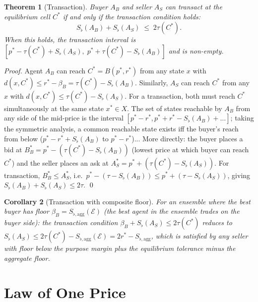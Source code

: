 \documentclass[twocolumn,11pt,a4paper]{article}
\newtheorem{theorem}{Theorem}[section]
\newtheorem{corollary}[theorem]{Corollary}
\theoremstyle{remark}
\newcommand{\Sflat}{S_{\flat}}
\newcommand{\tol}{\tau}
\newcommand{\Ens}{\mathcal{E}}
\newcommand{\MidP}{p^*}                  %
\newcommand{\Bid}{B^*}                   %
\newcommand{\Ask}{A^*}                   %
\newcommand{\SflatT}{S_{\flat,\mathrm{agg}}}        %
\begin{document}
\begin{theorem}[Transaction]
\label{thm:transaction}
Buyer $A_B$ and seller $A_S$ can transact at the equilibrium cell $C^*$
if and only if the transaction condition holds:
\[
  \Sflat(A_B) + \Sflat(A_S) \;\le\; 2\tol(C^*).
\]
When this holds, the \emph{transaction interval} is
$[\MidP - \tol(C^*) + \Sflat(A_S),\; \MidP + \tol(C^*) - \Sflat(A_B)]$
and is non-empty.
\end{theorem}
\begin{proof}
Agent $A_B$ can reach $C^* = B(\MidP, r^*)$ from any state $x$ with
$d(x, C^*) \le r^* - \beta_B = \tol(C^*) - \Sflat(A_B)$.  Similarly,
$A_S$ can reach $C^*$ from any $x$ with $d(x, C^*) \le \tol(C^*) -
\Sflat(A_S)$.  For a transaction, both must reach $C^*$ simultaneously
at the same state $x^* \in X$.  The set of states reachable by $A_B$ from
any side of the mid-price is the interval
$[\MidP - r^*, \MidP + r^* - \Sflat(A_B) + \ldots]$; taking the symmetric
analysis, a common reachable state exists iff the buyer's reach from below
($\MidP - r^* + \Sflat(A_B)$ to $\MidP - r^*$)... More directly:
the buyer places a bid at $\Bid_B = \MidP - (\tol(C^*) - \Sflat(A_B))$
(lowest price at which buyer can reach $C^*$) and the seller places an ask
at $\Ask_S = \MidP + (\tol(C^*) - \Sflat(A_S))$.  For transaction,
$\Bid_B \le \Ask_S$, i.e.\
$\MidP - (\tol - \Sflat(A_B)) \le \MidP + (\tol - \Sflat(A_S))$,
giving $\Sflat(A_B) + \Sflat(A_S) \le 2\tol$. \qed
\end{proof}

\begin{corollary}[Transaction with composite floor]
\label{cor:transaction-comp}
For an ensemble where the best buyer has floor $\beta_B = \SflatT(\Ens)$
(the best agent in the ensemble trades on the buyer side):
the transaction condition $\beta_B + \Sflat(A_S) \le 2\tol(C^*)$ reduces
to $\Sflat(A_S) \le 2\tol(C^*) - \SflatT(\Ens) = 2r^* - \SflatT$, which
is satisfied by any seller with floor below the purpose margin plus the
equilibrium tolerance minus the aggregate floor.
\end{corollary}

\section{Law of One Price}
\label{sec:loop}
\end{document}
